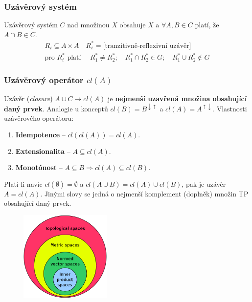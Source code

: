 \subsubsection{Uzávěrový systém}
Uzávěrový systém $C$ nad množinou $X$ obsahuje $X$ a $\forall A, B \in C$ platí, že $A \cap B \in C$.
\begin{equation*}
\begin{aligned}
R_i \subseteq A \times A \quad R_i^* = \textrm{[tranzitivně-reflexivní uzávěr]}\\
\textrm{pro } R_i^* \textrm{ platí } \quad R_1^* \neq R_2^*; \quad R_1^* \cap R_2^* \in G;\quad R_1^* \cup R_2^* \notin G
\end{aligned}
\end{equation*}

\subsubsection{Uzávěrový operátor $cl(A)$}
Uzávěr (\textit{closure}) $A \cup C \rightarrow cl(A)$ je \textbf{nejmenší uzavřená množina obsahující daný prvek}. Analogie u konceptů $cl(B) = B^{\downarrow\uparrow}$ a $cl(A) = A^{\uparrow\downarrow}$. Vlastnosti uzávěrového operátoru:
\begin{enumerate}
\item \textbf{Idempotence} -- $cl(cl(A)) = cl(A)$.
\item \textbf{Extensionalita} -- $A \subseteq cl(A)$.
\item \textbf{Monotónost} -- $A \subseteq B \Rightarrow cl(A) \subseteq cl(B)$.
\end{enumerate}

Platí-li navíc $cl(\emptyset) = \emptyset$ a $cl(A \cup B) = cl(A) \cup cl(B)$, pak je uzávěr $A = cl(A)$. Jinými slovy se jedná o nejmenší komplement (doplněk) množin TP obsahující daný prvek.
\\
\begin{figure}[H]
	\centering
	\includegraphics[width=0.4\textwidth]{assets/9_tpl_space}
\end{figure}



